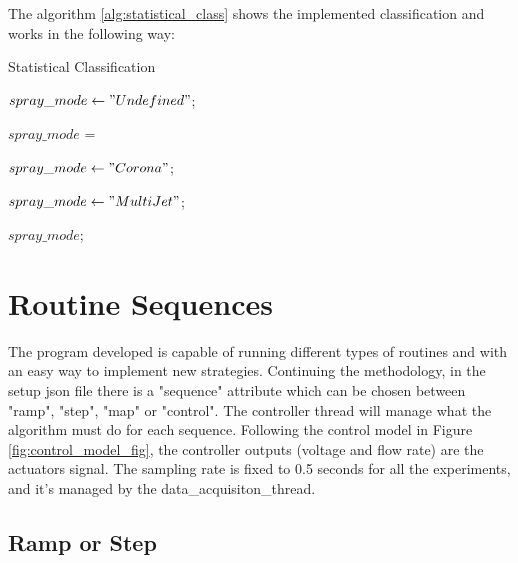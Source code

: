 	The algorithm \ref{alg:statistical_class} shows the implemented classification and works in the following way:

	\begin{algorithm}
        \caption{Statistical Classification}\label{alg:statistical_class}
        \begin{algorithmic}

            \State $spray\_mode \gets "Undefined"$;

            \State $spray\_mode$ =  
            
                \State $spray\_mode \gets "Corona"$;
            \EndIf

                    \State $spray\_ mode \gets "Multi Jet"$;
                \EndIf
            \EndIf

            \Return $spray\_ mode$;
        \EndFunction
        \end{algorithmic}
    \end{algorithm}



\section{Routine Sequences}
\label{sec:routine_sequences}

    The program developed is capable of running different types of routines and with an easy way to implement new strategies.
    Continuing the methodology, in the setup json file there is a "sequence" attribute which can be chosen between "ramp", "step", "map" or "control".
    The controller thread will manage what the algorithm must do for each sequence.
    Following the control model in Figure \ref{fig:control_model_fig}, the controller outputs (voltage and flow rate) are the actuators signal.
    The sampling rate is fixed to 0.5 seconds for all the experiments, and it's managed by the data\_acquisiton\_thread.


\subsection{Ramp or Step}
\label{subsec:step_routine}

